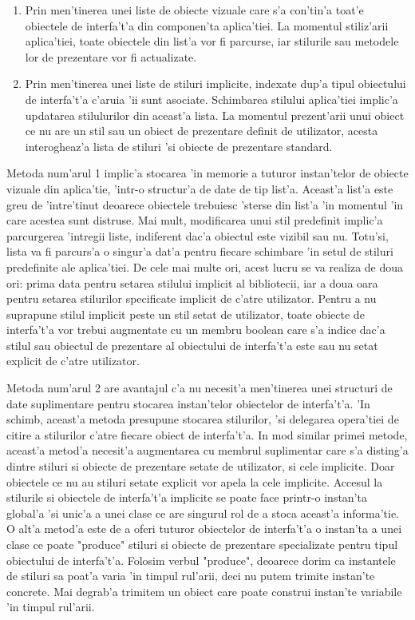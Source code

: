 \begin{enumerate}
\item Prin men'tinerea unei liste de obiecte vizuale care s'a con'tin'a toat'e obiectele de interfa't'a din componen'ta aplica'tiei. La momentul stiliz'arii aplica'tiei, toate obiectele din list'a vor fi parcurse, iar stilurile sau metodele lor de prezentare vor fi actualizate.
\item Prin men'tinerea unei liste de stiluri implicite, indexate dup'a tipul obiectului de interfa't'a c'aruia 'ii sunt asociate. Schimbarea stilului aplica'tiei implic'a updatarea stilulurilor din aceast'a lista. La momentul prezent'arii unui obiect ce nu are un stil sau un obiect de prezentare definit de utilizator, acesta interogheaz'a lista de stiluri 'si obiecte de prezentare standard.
\end{enumerate}

Metoda num'arul 1 implic'a stocarea 'in memorie a tuturor instan'telor de obiecte vizuale din aplica'tie, 'intr-o structur'a de date de tip list'a. Aceast'a list'a este greu de 'intre'tinut deoarece obiectele trebuiesc 'sterse din list'a 'in momentul 'in care acestea sunt distruse. Mai mult, modificarea unui stil predefinit implic'a parcurgerea 'intregii liste, indiferent dac'a obiectul este vizibil sau nu. Totu'si, lista va fi parcurs'a o singur'a dat'a pentru fiecare schimbare 'in setul de stiluri predefinite ale aplica'tiei. De cele mai multe ori, acest lucru se va realiza de doua ori: prima data pentru setarea stilului implicit al bibliotecii, iar a doua oara pentru setarea stilurilor specificate implicit de c'atre utilizator. Pentru a nu suprapune stilul implicit peste un stil setat de utilizator, toate obiecte de interfa't'a vor trebui augmentate cu un membru boolean care s'a indice dac'a stilul sau obiectul de prezentare al obiectului de interfa't'a este sau nu setat explicit de c'atre utilizator.

\medskip

Metoda num'arul 2 are avantajul c'a nu necesit'a men'tinerea unei structuri de date suplimentare pentru stocarea instan'telor obiectelor de interfa't'a. 'In schimb, aceast'a metoda presupune stocarea stilurilor, 'si delegarea opera'tiei de citire a stilurilor c'atre fiecare obiect de interfa't'a. In mod similar primei metode, aceast'a metod'a necesit'a augmentarea cu membrul suplimentar care s'a disting'a dintre stiluri si obiecte de prezentare setate de utilizator, si cele implicite. Doar obiectele ce nu au stiluri setate explicit vor apela la cele implicite. Accesul la stilurile si obiectele de interfa't'a implicite se poate face printr-o instan'ta global'a 'si unic'a a unei clase ce are singurul rol de a stoca aceast'a informa'tie. O alt'a metod'a este de a oferi tuturor obiectelor de interfa't'a o instan'ta a unei clase ce poate "produce" stiluri si obiecte de prezentare specializate pentru tipul obiectului de interfa't'a. Folosim verbul "produce", deoarece dorim ca instantele de stiluri sa poat'a varia 'in timpul rul'arii, deci nu putem trimite instan'te concrete. Mai degrab'a trimitem un obiect care poate construi instan'te variabile 'in timpul rul'arii.

